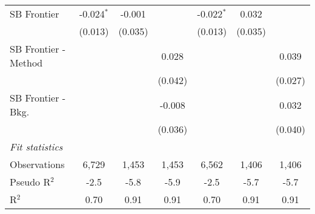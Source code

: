 \begin{tabular}{lcccccc}
   SB Frontier          & -0.024$^{*}$ & -0.001      &         & -0.022$^{*}$ & 0.032       &   \\   
                        & (0.013)      & (0.035)     &         & (0.013)      & (0.035)     &   \\   
   SB Frontier - Method &              &             & 0.028   &              &             & 0.039\\   
                        &              &             & (0.042) &              &             & (0.027)\\   
   SB Frontier - Bkg.   &              &             & -0.008  &              &             & 0.032\\   
                        &              &             & (0.036) &              &             & (0.040)\\   
   \midrule
   \emph{Fit statistics}\\
   Observations         & 6,729        & 1,453       & 1,453   & 6,562        & 1,406       & 1,406\\  
   Pseudo R$^2$         & -2.5         & -5.8        & -5.9    & -2.5         & -5.7        & -5.7\\  
   R$^2$                & 0.70         & 0.91        & 0.91    & 0.70         & 0.91        & 0.91\\  
   

\end{tabular}
